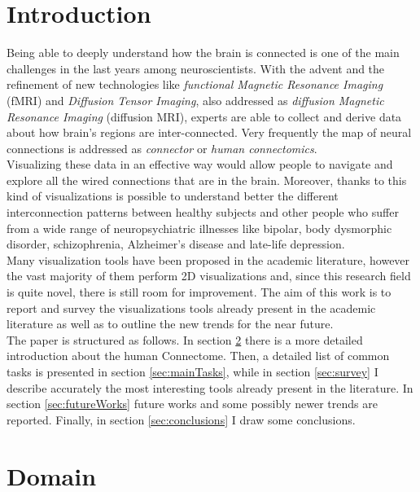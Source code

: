 \documentclass{article}
\begin{document}
\begin{multicols}{2}
\raggedcolumns

\section{Introduction}
\label{sec:introduction}

Being able to deeply understand how the brain is connected is one of the main challenges in the last years among neuroscientists. With the advent and the refinement of new technologies like \textit{functional Magnetic Resonance Imaging} (fMRI) and \textit{Diffusion Tensor Imaging}, also addressed as \textit{diffusion Magnetic Resonance Imaging} (diffusion MRI), experts are able to collect and derive data about how brain's regions are inter-connected. Very frequently the map of neural connections is addressed as \textit{connector} or \textit{human connectomics}.\\
Visualizing these data in an effective way would allow people to navigate and explore all the wired connections that are in the brain. Moreover, thanks to this kind of visualizations is possible to understand better the different interconnection patterns between healthy subjects and other people who suffer from a wide range of neuropsychiatric illnesses like bipolar, body dysmorphic disorder, schizophrenia, Alzheimer's disease and late-life depression. \\
Many visualization tools have been proposed in the academic literature, however the vast majority of them perform 2D visualizations and, since this research field is quite novel, there is still room for improvement.
The aim of this work is to report and survey the visualizations tools already present in the academic literature as well as to outline the new trends for the near future.\\
The paper is structured as follows. In section \ref{sec:domain} there is a more detailed introduction about the human Connectome. Then, a detailed list of common tasks is presented in section \ref{sec:mainTasks}, while in section \ref{sec:survey} I describe accurately the most interesting tools already present in the literature. In section \ref{sec:futureWorks} future works and some possibly newer trends are reported. Finally, in section \ref{sec:conclusions} I draw some conclusions.


\section{Domain}
\label{sec:domain}


\end{multicols}
\end{document}
